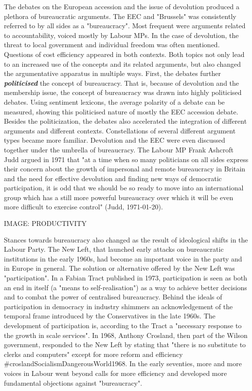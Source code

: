 \documentclass[
]{article}
\begin{document}
The debates on the European accession and the issue of devolution
produced a plethora of bureaucratic arguments. The EEC and "Brussels"
was consistently referred to by all sides as a "bureaucracy". Most
frequent were arguments related to accountability, voiced mostly by
Labour MPs. In the case of devolution, the threat to local government
and individual freedom was often mentioned. Questions of cost efficiency
appeared in both contexts. Both topics not only lead to an increased use
of the concepts and its related arguments, but also changed the
argumentative apparatus in multiple ways. First, the debates further
\textbf{\emph{politicised}} the concept of bureaucracy. That is, because
of devolution and the membership issue, the concept of bureaucracy was
drawn into highly politicised debates. Using sentiment lexicons, the
average polarity of a debate can be measured, showing this politicised
nature of mostly the EEC accession debate. Besides the politicization,
the debates also accelerated the integration of different arguments and
different contexts. Constellations of several different argument types
became more familiar. Devolution and the EEC were even discussed
together under the umbrella of bureaucracy. The Labour MP Frank Ashcroft
Judd argued in 1971 that "at a time when so many politicians on all
sides express their concern about the growth of impersonal and remote
bureaucracy in Britain and the need for effective devolution and finding
new ways of democratic participation, it is odd that we should be so
ready to move into an international group which has a still more
powerful bureaucracy over which it will be even more difficult to
exercise control" (Judd, 1971-01-20).

IMAGE: PRODUCTIVITY

Stances towards bureaucracy also changed as the result of ideological
shifts in the Labour Party. The New Left, that launched early attacks on
bureaucratic institutions in the early 1960s, had become an important
voice in the party and in Europe in general. The solution or alternative
offered by the New Left was "participation". In a Fabian Tract published
in 1973, participation is seen as both an end in itself (a "means to
self-realisation") as a way to achieve better decisions and to combat
the power of centralised bureaucracy. Behind the ideals of participation
in democracy in industry shimmers an acknowledgement of the temporal
frame introduced by the Conservatives in the late 1960s. The development
of participation is, according to the Tract a "necessary response to the
growth in scale services". In 1968, Anthony Crosland, then part of the
Wilson government, responded to the New Left by stating that "there is
no substitute to clerks and computers" except for more reform and
efficiency \#croslandSocialismDangerousWorld1968. In the early
seventies, more and more voices in Labour went beyond calls for more
efficiency and developed more fundamental objections against
"bureaucracy".
\end{document}

